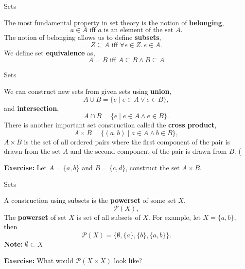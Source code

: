 \documentclass{beamer}
\begin{document}
\begin{frame}{Sets}

The most fundamental property in set theory is the notion of {\bf belonging},
\[
a \in A \mbox{ iff  $a$ is an element of the set $A$}.
\]
The notion of belonging allows us
to define {\bf subsets},
\[
Z \subseteq A \mbox{ iff } \forall e\in Z.\, e\in A.
\]
We define set {\bf equivalence} as,
\[
A = B \mbox{ iff } A \subseteq B \wedge B \subseteq A
\]
\end{frame}


\begin{frame}{Sets}

We can construct new sets from given sets using {\bf union},
\[
A \cup B = \{ e \mid e\in A \vee e \in B\},
\]
 and {\bf intersection},
\[
A \cap B = \{ e \mid  e\in A \wedge e \in B\}.
\]
There is another important set construction called the {\bf cross product},
\[
A\times B = \{ (a,b) \mid  a\in A \wedge b\in B\},
\]
$A\times B$ is the set of all ordered pairs where the first component of the pair is drawn from
the set $A$ and the second component of the pair is drawn from $B$. (

{\bf Exercise:} Let $A=\{a,b\}$ and $B=\{c,d\}$, construct the set $A\times B$.

\end{frame}

\begin{frame}{Sets}

A construction using subsets is the {\bf powerset} of some set $X$,
\[
{\mathcal P}(X),
\]
The {\bf powerset} of set $X$ is set of all subsets of $X$.  For example,
let $X = \{a,b\}$, then
\[
{\mathcal P}(X) = \{ \emptyset, \{a\}, \{b\}, \{a,b\} \}.
\]
{\bf Note:} $\emptyset \subset X$

\vspace{.1in}

{\bf Exercise:} What would ${\mathcal P}(X\times X)$ look like?

\end{frame}
\end{document}
